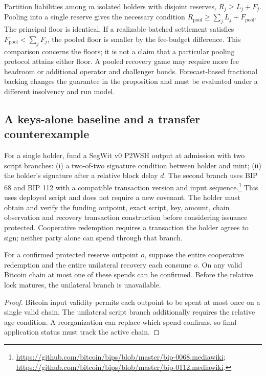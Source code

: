 Partition liabilities among $m$ isolated holders with disjoint reserves, $R_j\geq L_j+F_j$. Pooling into a single reserve gives the necessary condition $R_{\mathrm{pool}}\geq\sum_j L_j+F_{\mathrm{pool}}$. The principal floor is identical. If a realizable batched settlement satisfies $F_{\mathrm{pool}}<\sum_jF_j$, the pooled floor is smaller by the fee-budget difference. This comparison concerns the floors; it is not a claim that a particular pooling protocol attains either floor. A pooled recovery game may require more fee headroom or additional operator and challenger bonds. Forecast-based fractional backing changes the guarantee in the proposition and must be evaluated under a different insolvency and run model.

\subsection{A keys-alone baseline and a transfer counterexample}

For a single holder, fund a SegWit v0 P2WSH output at admission with two script branches: (i) a two-of-two signature condition between holder and mint; (ii) the holder's signature after a relative block delay $d$. The second branch uses BIP 68 and BIP 112 with a compatible transaction version and input sequence.\footnote{\url{https://github.com/bitcoin/bips/blob/master/bip-0068.mediawiki}; \url{https://github.com/bitcoin/bips/blob/master/bip-0112.mediawiki}.} This uses deployed script and does not require a new covenant. The holder must obtain and verify the funding outpoint, exact script, key, amount, chain observation and recovery transaction construction before considering issuance protected. Cooperative redemption requires a transaction the holder agrees to sign; neither party alone can spend through that branch.

\begin{proposition}
\label{prop:cashu-exclusion}
For a confirmed protected reserve outpoint $o$, suppose the entire cooperative redemption and the entire unilateral recovery each consume $o$. On any valid Bitcoin chain at most one of these spends can be confirmed. Before the relative lock matures, the unilateral branch is unavailable.
\end{proposition}
\begin{proof}
Bitcoin input validity permits each outpoint to be spent at most once on a single valid chain. The unilateral script branch additionally requires the relative age condition. A reorganization can replace which spend confirms, so final application status must track the active chain.
\end{proof}

